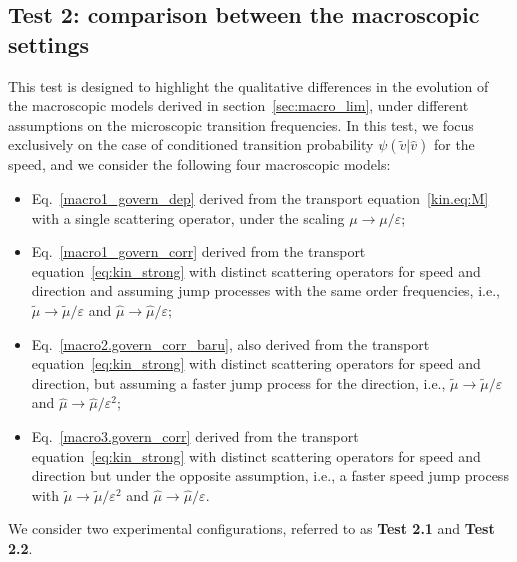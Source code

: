 \documentclass[a4paper]{article}
\theoremstyle{Theorem}\newtheorem{proposition}{Proposition}[section]
\theoremstyle{Remark}\newtheorem{remark}{Remark}[section]
\theoremstyle{Theorem}\newtheorem{theorem}{Theorem}[section]
\newcommand{\hv}{\hat{v}}
\newcommand{\tv}{\tilde{v}}
\newcommand{\hmu}{\hat{\mu}}
\newcommand{\tmu}{\tilde{\mu}}
\begin{document}
\subsection{Test 2: comparison between the macroscopic settings}\label{sec:num_test2}
This test is designed to highlight the qualitative differences in the evolution of the macroscopic models derived in section~\ref{sec:macro_lim}, under different assumptions on the microscopic transition frequencies. In this test, we focus exclusively on the case of conditioned transition probability $\psi(\tv|\hv)$ for the speed, and we consider the following four macroscopic models:
\begin{itemize}
    \item[(M1)] Eq.~\eqref{macro1_govern_dep} derived from the transport equation~\eqref{kin.eq:M} with a single scattering operator, under the scaling $\mu\to\mu/\varepsilon$;
    \item[(M2)]  Eq.~\eqref{macro1_govern_corr} derived from the transport equation~\eqref{eq:kin_strong} with distinct scattering operators for speed and direction and assuming jump processes with the same order frequencies, i.e., $\tmu\to\tmu/\varepsilon$ and $\hmu\to\hmu/\varepsilon$;
    \item[(M3)] Eq.~\eqref{macro2.govern_corr_baru}, also derived from the transport equation~\eqref{eq:kin_strong} with distinct scattering operators for speed and direction, but assuming a faster jump process for the direction, i.e., $\tmu\to\tmu/\varepsilon$ and $\hmu\to\hmu/\varepsilon^2$;
    \item[(M4)] Eq.~\eqref{macro3.govern_corr} derived from the transport equation~\eqref{eq:kin_strong} with distinct scattering operators for speed and direction but under the opposite assumption, i.e., a faster speed jump process with $\tmu\to\tmu/\varepsilon^2$ and $\hmu\to\hmu/\varepsilon$.
\end{itemize}
We consider two experimental configurations, referred to as {\bf Test 2.1} and {\bf Test 2.2}. 
\end{document}
